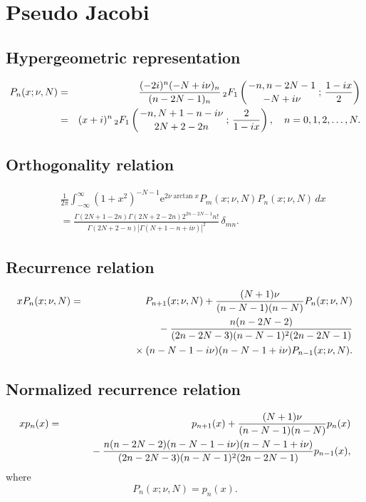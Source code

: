 \documentclass[envcountchap,graybox]{svmono}
\newcommand{\hyp}[5]{\mbox{}_{#1}{F}_{#2}
\left(\genfrac{}{}{0pt}{}{#3}{#4}\,;\,#5\right)}
\newcommand{\mathindent}{\hspace{7.5mm}}
\newcommand{\e}{\textrm{e}}
\renewcommand{\Gamma}{\varGamma}
\begin{document}
\newpage

\section{Pseudo Jacobi}

\par\setcounter{equation}{0}

\subsection*{Hypergeometric representation}
\begin{eqnarray}
\label{DefPseudoJacobi}
P_n(x;\nu,N)&=&\frac{(-2i)^n(-N+i\nu)_n}{(n-2N-1)_n}\,\hyp{2}{1}{-n,n-2N-1}{-N+i\nu}{\frac{1-ix}{2}}\\
&=&(x+i)^n\,\hyp{2}{1}{-n,N+1-n-i\nu}{2N+2-2n}{\frac{2}{1-ix}},\quad n=0,1,2,\ldots,N.\nonumber
\end{eqnarray}

\subsection*{Orthogonality relation}
\begin{eqnarray}
\label{OrtPseudoJacobi}
& &\frac{1}{2\pi}\int_{-\infty}^{\infty}(1+x^2)^{-N-1}\e^{2\nu\arctan x}P_m(x;\nu,N)P_n(x;\nu,N)\,dx\nonumber\\
& &{}=\frac{\Gamma(2N+1-2n)\Gamma(2N+2-2n)2^{2n-2N-1}n!}{\Gamma(2N+2-n)\left|\Gamma(N+1-n+i\nu)\right|^2}\,\delta_{mn}.
\end{eqnarray}

\subsection*{Recurrence relation}
\begin{eqnarray}
\label{RecPseudoJacobi}
xP_n(x;\nu,N)&=&P_{n+1}(x;\nu,N)+\frac{(N+1)\nu}{(n-N-1)(n-N)}P_n(x;\nu,N)\nonumber\\
& &{}\mathindent{}-\frac{n(n-2N-2)}{(2n-2N-3)(n-N-1)^2(2n-2N-1)}\nonumber\\
& &{}\mathindent\mathindent\times(n-N-1-i\nu)(n-N-1+i\nu)P_{n-1}(x;\nu,N).
\end{eqnarray}

\subsection*{Normalized recurrence relation}
\begin{eqnarray}
\label{NormRecPseudoJacobi}
xp_n(x)&=&p_{n+1}(x)+\frac{(N+1)\nu}{(n-N-1)(n-N)}p_n(x)\nonumber\\
& &{}\mathindent{}-\frac{n(n-2N-2)(n-N-1-i\nu)(n-N-1+i\nu)}{(2n-2N-3)(n-N-1)^2(2n-2N-1)}p_{n-1}(x),
\end{eqnarray}
where
$$P_n(x;\nu,N)=p_n(x).$$
\end{document}

